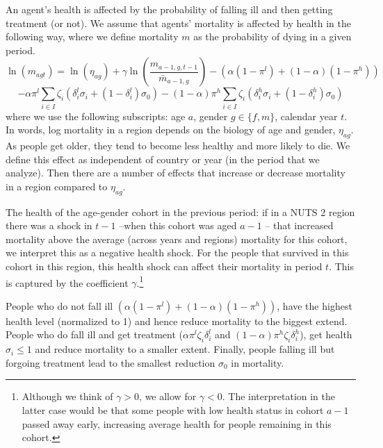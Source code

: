 \documentclass[a4paper,12pt]{article}
\begin{document}
An agent's health is affected by the probability of falling ill and then getting treatment (or not). We assume that agents' mortality is affected by health in the following way, where we define mortality \(m\) as the probability of dying in a given period.
\begin{equation}
\label{eq:health}
\ln(m_{agt}) = \ln({\eta}_{ag}) + \gamma \ln \left( \frac{m_{a-1,g,t-1}}{\bar m_{a-1,g}}\right) - (\alpha (1-\pi^l) + (1-\alpha) (1-\pi^{h})) \end{equation}
\begin{equation*}
 - \alpha \pi^l \sum_{i \in I} \zeta_i (\delta_i^l \sigma_i + (1-\delta_i^l)\sigma_0) - (1-\alpha) \pi^h \sum_{i \in I} \zeta_i (\delta_i^h \sigma_i + (1-\delta_i^h) \sigma_0)
\end{equation*}
where we use the following subscripts: age \(a\), gender \(g \in \{f,m\}\), calendar year \(t\). In words, log mortality in a region depends on the biology of age and gender, \(\eta_{ag}\). As people get older, they tend to become less healthy and more likely to die. We define this effect as independent of country or year (in the period that we analyze). Then there are a number of effects that increase or decrease mortality in a region compared to \(\eta_{ag}\).

The health of the age-gender cohort in the previous period: if in a NUTS 2 region there was a shock in \(t-1\) --when this cohort was aged \(a-1\) -- that increased mortality above the average (across years and regions) mortality for this cohort, we interpret this as a negative health shock. For the people that survived in this cohort in this region, this health shock can affect their mortality in period \(t\). This is captured by the coefficient \(\gamma\).\footnote{Although we think of \(\gamma>0\), we allow for \(\gamma<0\). The interpretation in the latter case would be that some people with low health status in cohort \(a-1\) passed away early, increasing average health for people remaining in this cohort.}

People who do not fall ill \((\alpha(1-\pi^l)+(1-\alpha)(1-\pi^h))\), have the highest health level (normalized to 1) and hence reduce mortality to the biggest extend. People who do fall ill and get treatment (\(\alpha \pi^l \zeta_i \delta_i^l\) and \((1-\alpha)\pi^h \zeta_i \delta_i^h\)), get health \(\sigma_i \leq 1\) and reduce mortality to a smaller extent. Finally, people falling ill but forgoing treatment lead to the smallest reduction \(\sigma_0\) in mortality.
\end{document}
